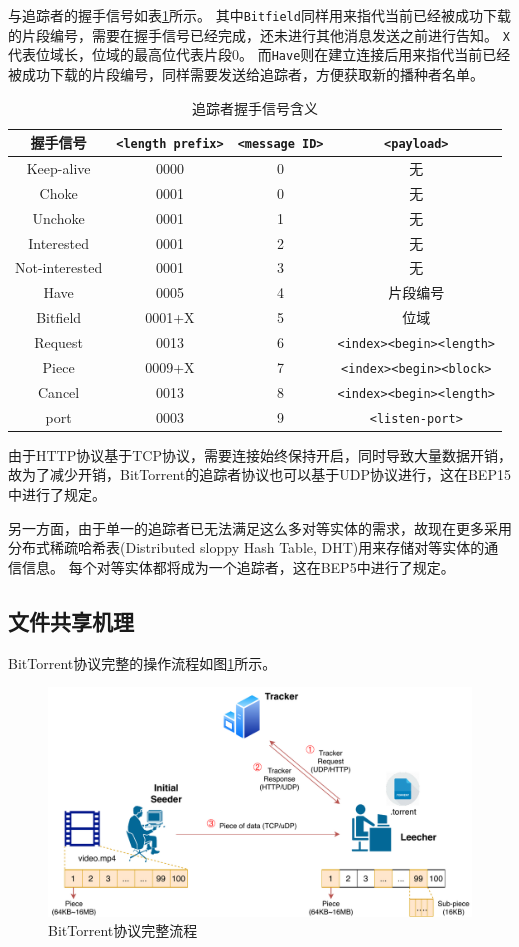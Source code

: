 \documentclass[thesis]{thesis}
\begin{document}
与追踪者的握手信号如表\ref{tab:tracker_handshake}所示。
其中\verb'Bitfield'同样用来指代当前已经被成功下载的片段编号，需要在握手信号已经完成，还未进行其他消息发送之前进行告知。
\verb'X'代表位域长，位域的最高位代表片段0。
而\verb'Have'则在建立连接后用来指代当前已经被成功下载的片段编号，同样需要发送给追踪者，方便获取新的播种者名单。
\begin{table}[htbp]
\caption{追踪者握手信号含义}
\label{tab:tracker_handshake}
\centering
\begin{tabular}{|c|c|c|c|}\hline
\textbf{握手信号} & \verb'<length prefix>' & \verb'<message ID>' & \verb'<payload>'\\\hline
Keep-alive & 0000 & 0 & 无\\\hline
Choke & 0001 & 0 & 无\\\hline
Unchoke & 0001 & 1 & 无\\\hline
Interested & 0001 & 2 & 无\\\hline
Not-interested & 0001 & 3 & 无\\\hline
Have & 0005 & 4 & 片段编号\\\hline
Bitfield & 0001+X & 5 & 位域\\\hline
Request & 0013 & 6 & \verb'<index><begin><length>'\\\hline
Piece & 0009+X & 7 & \verb'<index><begin><block>'\\\hline
Cancel & 0013 & 8 & \verb'<index><begin><length>'\\\hline
port & 0003 & 9 & \verb'<listen-port>'\\\hline
\end{tabular}
\end{table}

由于HTTP协议基于TCP协议，需要连接始终保持开启，同时导致大量数据开销，故为了减少开销，BitTorrent的追踪者协议也可以基于UDP协议进行，这在BEP15\cite{bt_udp}中进行了规定。

另一方面，由于单一的追踪者已无法满足这么多对等实体的需求，故现在更多采用分布式稀疏哈希表(Distributed sloppy Hash Table, DHT)用来存储对等实体的通信信息。
每个对等实体都将成为一个追踪者，这在BEP5\cite{bt_dht}中进行了规定。

\subsection{文件共享机理}
\label{sub:share}
BitTorrent协议完整的操作流程如图\ref{fig:overview}所示。

\begin{figure}[htbp]
\centering
\includegraphics[width=0.8\linewidth]{fig/BitTorrent-BitTorrent.pdf}
\caption{BitTorrent协议完整流程}
\label{fig:overview}
\end{figure}
\end{document}
